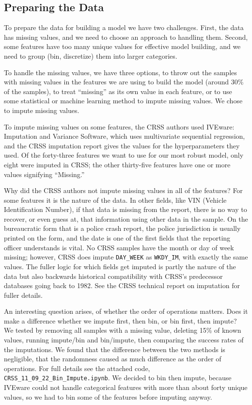 \subsection{Preparing the Data}

To prepare the data for building a model we have two challenges.  First, the data has missing values, and we need to choose an approach to handling them.  Second, some features have too many unique values for effective model building, and we need to group (bin, discretize) them into larger categories.  

To handle the missing values, we have three options, to throw out the samples with missing values in the features we are using to build the model (around 30\% of the samples), to treat ``missing'' as its own value in each feature, or to use some statistical or machine learning method to impute missing values.  We chose to impute missing values.  

To impute missing values on some features, the CRSS authors used IVEware: Imputation and Variance Software, which uses multivariate sequential regression, and the CRSS imputation report gives the values for the hyperparameters they used. \citep{CRSS_Imputation}  Of the forty-three features we want to use for our most robust model, only eight were imputed in CRSS; the other thirty-five features have one or more values signifying ``Missing.''

Why did the CRSS authors not impute missing values in all of the features?  For some features it is the nature of the data.  In other fields, like VIN (Vehicle Identification Number), if that data is missing from the report, there is no way to recover, or even guess at, that information using other data in the sample.  On the bureaucratic form that is a police crash report, the police jurisdiction is usually printed on the form, and the date is one of the first fields that the reporting officer understands is vital.  No CRSS samples have the month or day of week missing; however, CRSS does impute \verb|DAY_WEEK| as \verb|WKDY_IM|, with exactly the same values.  The fuller logic for which fields get imputed is partly the nature of the data but also backwards historical compatibility with CRSS's predecessor databases going back to 1982.  See the CRSS technical report on imputation for fuller details.  \citep{CRSS_Imputation}


An interesting question arises, of whether the order of operations matters.  Does it make a difference whether we impute first, then bin, or bin first, then impute?  We tested by removing all samples with a missing value, deleting 15\% of known values, running impute/bin and bin/impute, then comparing the success rates of the imputations.  We found that the difference between the two methods is negligible, that the randomness caused as much difference as the order of operations.  For full details see the attached code, 
\verb|CRSS_11_09_22_Bin_Impute.ipynb|.  We decided to bin then impute, because IVEware could not handle categorical features with more than about forty unique values, so we had to bin some of the features before imputing anyway.

